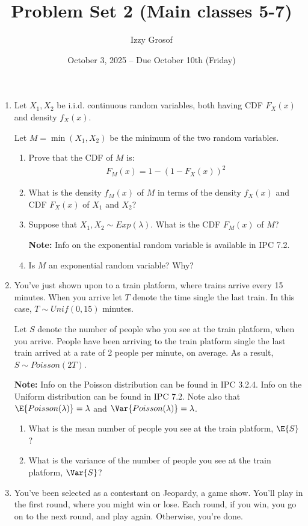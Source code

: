 \documentclass{article}
\title{Problem Set 2 (Main classes 5-7)}
\author{Izzy Grosof}
\date{October 3, 2025 -- Due October 10th (Friday)}
\begin{document}
\maketitle

\begin{enumerate}
\item Let $X_1, X_2$ be i.i.d. continuous random variables,
both having CDF $F_X(x)$ and density $f_X(x)$.

Let $M = \min(X_1, X_2)$ be the minimum of the two random variables.
\begin{enumerate}
    \item Prove that the CDF of $M$ is:
    \begin{align*}
        F_M(x) = 1 - (1-F_X(x))^2
    \end{align*}
    \item What is the density $f_M(x)$ of $M$ in terms of the density $f_X(x)$ and CDF $F_X(x)$ of $X_1$ and $X_2$?
    \item Suppose that $X_1, X_2 \sim Exp(\lambda)$.
    What is the CDF $F_M(x)$ of $M$?

    \textbf{Note:} Info on the exponential random variable is available in IPC 7.2.
    \item Is $M$ an exponential random variable? Why?
\end{enumerate}
\item You've just shown upon to a train platform,
where trains arrive every 15 minutes.
When you arrive let $T$ denote the time single the last train.
In this case, $T \sim Unif(0, 15)$ minutes.

Let $S$ denote the number of people who you see at the train platform, when you arrive.
People have been arriving to the train platform single the last train arrived at a rate of 2 people per minute, on average.
As a result, $S \sim Poisson(2 T)$.

\textbf{Note:} Info on the Poisson distribution can be found in IPC 3.2.4. Info on the Uniform distribution can be found in IPC 7.2. Note also that $\E{Poisson(\lambda)} = \lambda$ and $\Var{Poisson(\lambda)} = \lambda$.
\begin{enumerate}
    \item What is the mean number of people you see at the train platform, $\E{S}$?
    \item What is the variance of the number of people you see at the train platform, $\Var{S}$?
\end{enumerate}

\item You've been selected as a contestant on Jeopardy, a game show.
You'll play in the first round, where you might win or lose.
Each round, if you win, you go on to the next round, and play again.
Otherwise, you're done.


\end{enumerate}
\end{document}
